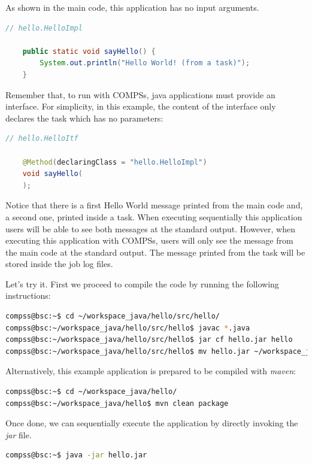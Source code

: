 As shown in the main code, this application has no input arguments. 

\begin{lstlisting}[language=java]
	// hello.HelloImpl
	
	public static void sayHello() {
		System.out.println("Hello World! (from a task)");
	}
\end{lstlisting}

Remember that, to run with COMPSs, java applications must provide an interface. For simplicity, in this example, the content of the interface only
declares the task which has no parameters:
\begin{lstlisting}[language=java]
	// hello.HelloItf
	
	@Method(declaringClass = "hello.HelloImpl")
	void sayHello(
	);
\end{lstlisting}

Notice that there is a first Hello World message printed from the main code and, a second one, printed inside a task. When executing sequentially
this application users will be able to see both messages at the standard output. However, when executing this application with COMPSs, users will only
see the message from the main code at the standard output. The message printed from the task will be stored inside the job log files. 

Let's try it. First we proceed to compile the code by running the following instructions:

\begin{lstlisting}[language=bash]
compss@bsc:~$ cd ~/workspace_java/hello/src/hello/
compss@bsc:~/workspace_java/hello/src/hello$ javac *.java
compss@bsc:~/workspace_java/hello/src/hello$ jar cf hello.jar hello
compss@bsc:~/workspace_java/hello/src/hello$ mv hello.jar ~/workspace_java/hello/jar/
\end{lstlisting}

Alternatively, this example application is prepared to be compiled with \textit{maven}:

\begin{lstlisting}[language=bash]
compss@bsc:~$ cd ~/workspace_java/hello/
compss@bsc:~/workspace_java/hello$ mvn clean package
\end{lstlisting}

Once done, we can sequentially execute the application by directly invoking the \textit{jar} file.

\begin{lstlisting}[language=bash]
compss@bsc:~$ java -jar hello.jar
\end{lstlisting}

